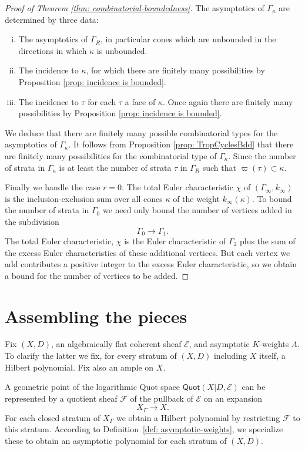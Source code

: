\documentclass[11pt]{amsart}
\theoremstyle{definition}
\theoremstyle{definition}
\begin{document}
\begin{proof}[Proof of Theorem \ref{thm: combinatorial-boundedness}]
    The asymptotics of $\Gamma_\kappa$ are determined by three data:
    \begin{enumerate}[(i)]
        \item The asymptotics of $\Gamma_R$, in particular cones which are unbounded in the directions in which $\kappa$ is unbounded.
        \item The incidence to $\kappa$, for which there are finitely many possibilities by Proposition \ref{prop: incidence is bounded}.
        \item The incidence to $\tau$ for each $\tau$ a face of $\kappa$. Once again there are finitely many possibilities by Proposition \ref{prop: incidence is bounded}.
    \end{enumerate}
    We deduce that there are finitely many possible combinatorial types for the asymptotics of $\Gamma_\kappa$. It follows from Proposition \ref{prop: TropCyclesBdd} that there are finitely many possibilities for the combinatorial type of $\Gamma_\kappa$. Since the number of strata in $\Gamma_\kappa$ is at least the number of strata $\tau$ in $\Gamma_R$ such that $\varpi(\tau) \subset \kappa$.

    Finally we handle the case $r=0$. The total Euler characteristic $\chi$ of $(\Gamma_\infty,k_\infty)$ is the inclusion-exclusion sum over all cones $\kappa$ of the weight $k_\infty(\kappa)$. To bound the number of strata in $\Gamma_0$ we need only bound the number of vertices added in the subdivision $$\Gamma_0\rightarrow \Gamma_1.$$ The total Euler characteristic, $\chi$ is the Euler characteristic of $\Gamma_2$ plus the sum of the excess Euler characteristics of these additional vertices. But each vertex we add contributes a positive integer to the excess Euler characteristic, so we obtain a bound for the number of vertices to be added.
\end{proof}

\section{Assembling the pieces}

Fix $(X,D)$, an algebraically flat coherent sheaf $\mathcal E$, and asymptotic $K$-weights $\Lambda$. To clarify the latter we fix, for every stratum of $(X,D)$ including $X$ itself, a Hilbert polynomial. Fix also an ample on $X$.

A geometric point of the logarithmic Quot space $\mathsf{Quot}(X|D,\mathcal E)$ can be represented by a quotient sheaf $\mathcal F$ of the pullback of $\mathcal E$ on an expansion
\[
X_\Gamma\to X.
\]
For each closed stratum of $X_\Gamma$ we obtain a Hilbert polynomial by restricting $\mathcal F$ to this stratum. According to Definition~\ref{def: asymptotic-weights}, we specialize these to obtain an asymptotic polynomial for each stratum of $(X,D)$. 
\end{document}
